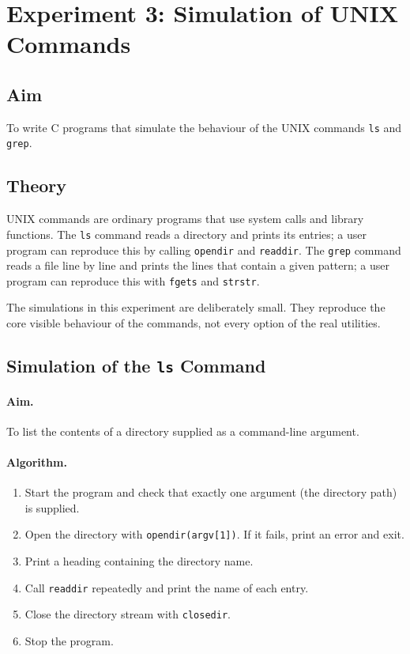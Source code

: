 \section{Experiment 3: Simulation of UNIX Commands}
\label{exp:simulate}

\subsection*{Aim}
To write C programs that simulate the behaviour of the UNIX commands \texttt{ls} and \texttt{grep}.

\subsection*{Theory}
UNIX commands are ordinary programs that use system calls and library functions. The \texttt{ls} command reads a directory and prints its entries; a user program can reproduce this by calling \texttt{opendir} and \texttt{readdir}. The \texttt{grep} command reads a file line by line and prints the lines that contain a given pattern; a user program can reproduce this with \texttt{fgets} and \texttt{strstr}.

The simulations in this experiment are deliberately small. They reproduce the core visible behaviour of the commands, not every option of the real utilities.

\subsection{Simulation of the \texttt{ls} Command}

\paragraph{Aim.}
To list the contents of a directory supplied as a command-line argument.

\paragraph{Algorithm.}
\begin{enumerate}
    \item Start the program and check that exactly one argument (the directory path) is supplied.
    \item Open the directory with \texttt{opendir(argv[1])}. If it fails, print an error and exit.
    \item Print a heading containing the directory name.
    \item Call \texttt{readdir} repeatedly and print the name of each entry.
    \item Close the directory stream with \texttt{closedir}.
    \item Stop the program.
\end{enumerate}

